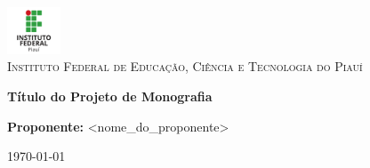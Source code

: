 \begin{titlepage}
\begin{center}

\includegraphics[width=0.12\textwidth]{img/logo_ifpi.png}~\\[1cm]

\textsc{\Large Instituto Federal de Educação, Ciência e Tecnologia do Piauí\\[5cm]}



{\large \bfseries Título do Projeto de Monografia \\[3cm]}


\large\textbf{Proponente:}
<nome\_do\_proponente>\\[3cm]

\vfill

{\large \today}

\end{center}
\end{titlepage}